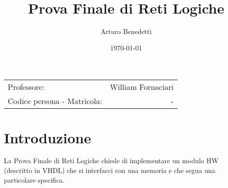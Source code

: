 \documentclass{article}
\title{Prova Finale di Reti Logiche} %
\author{Arturo Benedetti} %
\date{\today} %
\begin{document}

\maketitle %

\begin{center}
\begin{tabular}{l r}
Professore: & William Fornaciari \\
Codice persona - Matricola: &  - 
\end{tabular}
\end{center}

\clearpage
\tableofcontents
\clearpage



\section{Introduzione}
La Prova Finale di Reti Logiche chiede di implementare un modulo HW (descritto in VHDL) che si interfacci con una memoria e che segua una particolare specifica.
\end{document}
